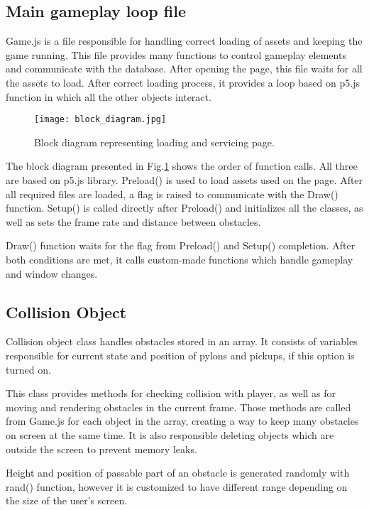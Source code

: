 \documentclass[oneside,a4paper,11pt]{report}
\begin{document}
\subsection{Main gameplay loop file}
Game.js is a file responsible for handling correct loading of assets and keeping the game running. This file provides many functions to control gameplay elements and communicate with the database. After opening the page, this file waits for all the assets to load. After correct loading process, it provides a loop based on p5.js function in which all the other objects interact.

\begin{figure}
	\centering
	\texttt{[image: block\_diagram.jpg]}
	\caption{Block diagram representing loading and servicing page.\label{fig:block_diagram}}
\end{figure}

\par
The block diagram presented in Fig.\ref{fig:block_diagram} shows the order of function calls. All three are based on p5.js library. Preload() is used to load assets used on the page. After all required files are loaded, a flag is raised to communicate with the Draw() function. Setup() is called directly after Preload() and initializes all the classes, as well as sets the frame rate and distance between obstacles.

\par
Draw() function waits for the flag from Preload() and Setup() completion. After both conditions are met, it calls custom-made functions which handle gameplay and window changes.

\subsection{Collision Object}

Collision object class handles obstacles stored in an array. It consists of variables responsible for current state and position of pylons and pickups, if this option is turned on.

\par
This class provides methods for checking collision with player, as well as for moving and rendering obstacles in the current frame. Those methods are called from Game.js for each object in the array, creating a way to keep many obstacles on screen at the same time. It is also responsible deleting objects which are outside the screen to prevent memory leaks.

\par
Height and position of passable part of an obstacle is generated randomly with rand() function, however it is customized to have different range depending on the size of the user's screen.
\end{document}

